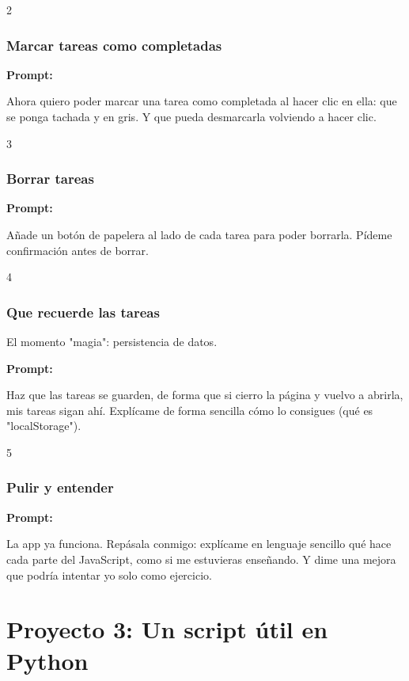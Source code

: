 \documentclass[11pt,a4paper]{report}
\begin{document}
2\subsubsection{Marcar tareas como completadas}

\noindent\textbf{Prompt: }
\begin{codebox}
Ahora quiero poder marcar una tarea como completada al hacer clic en ella: que se ponga tachada y en gris. Y que pueda desmarcarla volviendo a hacer clic.
\end{codebox}

3\subsubsection{Borrar tareas}

\noindent\textbf{Prompt: }
\begin{codebox}
Añade un botón de papelera al lado de cada tarea para poder borrarla. Pídeme confirmación antes de borrar.
\end{codebox}

4\subsubsection{Que recuerde las tareas}

El momento "magia": persistencia de datos.

\noindent\textbf{Prompt: }
\begin{codebox}
Haz que las tareas se guarden, de forma que si cierro la página y vuelvo a abrirla, mis tareas sigan ahí. Explícame de forma sencilla cómo lo consigues (qué es "localStorage").
\end{codebox}

5\subsubsection{Pulir y entender}

\noindent\textbf{Prompt: }
\begin{codebox}
La app ya funciona. Repásala conmigo: explícame en lenguaje sencillo qué hace cada parte del JavaScript, como si me estuvieras enseñando. Y dime una mejora que podría intentar yo solo como ejercicio.
\end{codebox}

\section{ Proyecto 3: Un script útil en Python}
\end{document}

